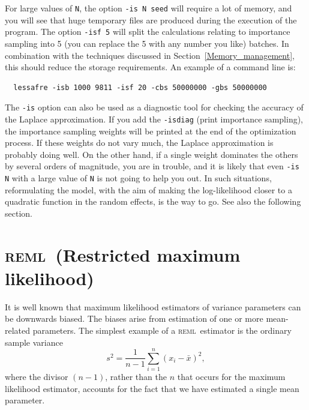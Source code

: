 \documentclass{admbmanual}
\newcommand{\scREML}{\textsc{reml}}
\begin{document}
For large values of \texttt{N}, the option \texttt{-is N seed} will require a
lot of memory, and you will see that huge temporary files are produced during
the execution of the program. The option \texttt{-isf 5} will split the
calculations relating to importance sampling into 5 (you can replace the 5 with
any number you like) batches. In combination with the techniques discussed in
Section~\ref{Memory_management}, this should reduce the storage requirements. An
example of a command line is:
\begin{lstlisting}
  lessafre -isb 1000 9811 -isf 20 -cbs 50000000 -gbs 50000000
\end{lstlisting}

The \texttt{-is} option can also be used as a diagnostic tool for checking the
accuracy of the Laplace approximation. If you add the \texttt{-isdiag} (print
importance sampling), the importance sampling weights will be printed at the end
of the optimization process. If these weights do not vary much, the Laplace
approximation is probably doing well. On the other hand, if a single weight
dominates the others by several orders of magnitude, you are in trouble, and it
is likely that even \texttt{-is N} with a large value of \texttt{N} is not going
to help you out. In such situations, reformulating the model, with the aim of
making the log-likelihood closer to a quadratic function in the random effects,
is the way to go. See also the following section.

\section{\scREML\ (Restricted maximum likelihood)}
\label{sec:reml}

It is well known that maximum likelihood estimators of variance parameters can
be downwards biased. The biases arise from estimation of one or more
mean-related parameters. The simplest example of a \scREML\ estimator is the
ordinary sample variance
$$
s^2 = \frac{1}{n-1}\sum_{i=1}^n(x_i-\bar x)^2,
$$
where the divisor $(n-1)$, rather than the $n$ that occurs for the maximum
likelihood estimator, accounts for the fact that we have estimated a single mean
parameter.
\end{document}
